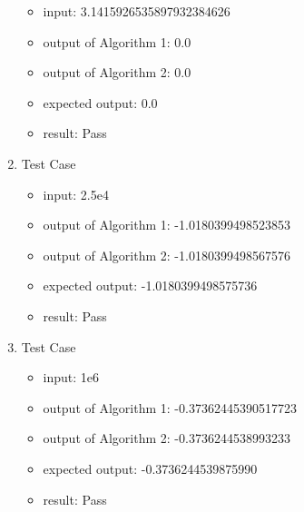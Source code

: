 \documentclass{article}
\begin{document}
\begin{enumerate}
    \begin{itemize}
        \item input: 3.1415926535897932384626
        \item output of Algorithm 1: 0.0
        \item output of Algorithm 2: 0.0
        \item expected output: 0.0
        \item result: Pass
    \end{itemize}
    \item Test Case 
    \begin{itemize}
        \item input: 2.5e4
        \item output of Algorithm 1: -1.0180399498523853
        \item output of Algorithm 2: -1.0180399498567576
        \item expected output: -1.0180399498575736
        \item result: Pass
    \end{itemize}
    \item Test Case 
    \begin{itemize}
        \item input: 1e6
        \item output of Algorithm 1: -0.37362445390517723
        \item output of Algorithm 2: -0.3736244538993233
        \item expected output: -0.3736244539875990
        \item result: Pass
    \end{itemize}
\end{enumerate}


\newpage
\renewcommand{\headrulewidth}{0pt}
\fancyhf{}
\printbibliography
\end{document}
